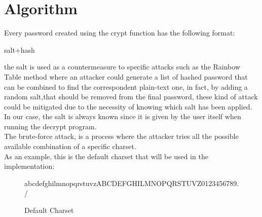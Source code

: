 \documentclass[10pt,twocolumn,letterpaper]{article}
\newenvironment{Shaded}{}{}
\newcommand{\ExtensionTok}[1]{#1}
\begin{document}
\vspace{3cm}

\section{Algorithm}

Every password created using the crypt function has the following format:\\
\begin{Shaded}
\begin{Highlighting}[]
\ExtensionTok{salt+hash}
\end{Highlighting}
\end{Shaded}
the salt is used as a countermeasure to specific attacks such as the Rainbow Table method where an attacker could generate a list of 
hashed password that can be combined to find the correspondent plain-text one, in fact, by adding a random salt,that should be removed 
from the final password, these kind of attack could be mitigated due to the necessity of knowing which salt has been applied.\\
In our case, the salt is always known since it is given by the user itself when running the decrypt program.\\
The brute-force attack, is a process where the attacker tries all the possible available combination of a specific charset.\\
As an example, this is the default charset that will be used in the implementation:\\

\begin{figure}[H]\label{default-charset}
\begin{footnotesize}
abcdefghilmnopqrstuvzABCDEFGHILMNOPQRSTUVZ0123456789./
\end{footnotesize}
\caption{Default Charset}
\end{figure}
\end{document}
